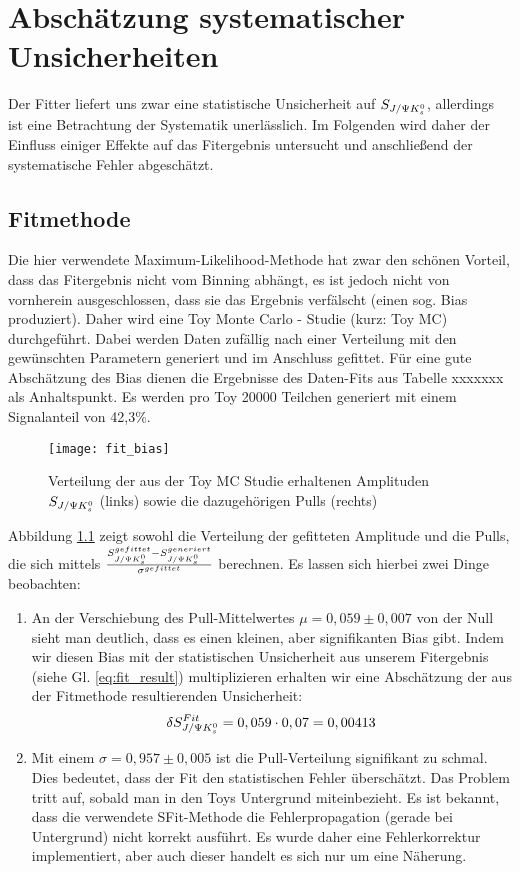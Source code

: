 \chapter{Abschätzung systematischer Unsicherheiten}
Der Fitter liefert uns zwar eine statistische Unsicherheit auf $S_{J/\Psi K_s^0}$, allerdings ist eine Betrachtung der Systematik unerlässlich. Im Folgenden wird daher der Einfluss einiger Effekte auf das Fitergebnis untersucht und anschließend der systematische Fehler abgeschätzt.

\section{Fitmethode} \label{kap:fit_bias}
Die hier verwendete Maximum-Likelihood-Methode hat zwar den schönen Vorteil, dass das Fitergebnis nicht vom Binning abhängt, es ist jedoch nicht von vornherein ausgeschlossen, dass sie das Ergebnis verfälscht (einen sog. Bias produziert). Daher wird eine Toy Monte Carlo - Studie (kurz: Toy MC) durchgeführt. Dabei werden Daten zufällig nach einer Verteilung mit den gewünschten Parametern generiert und im Anschluss gefittet. Für eine gute Abschätzung des Bias dienen die Ergebnisse des Daten-Fits aus Tabelle xxxxxxx als Anhaltspunkt. Es werden pro Toy 20000 Teilchen generiert mit einem Signalanteil von 42,3\%.

\begin{figure}[hptb]
\centering
\texttt{[image: fit\_bias]}
\caption{Verteilung der aus der Toy MC Studie erhaltenen Amplituden $S_{J/\Psi K_s^0}$ (links) sowie die dazugehörigen Pulls (rechts)}
\label{fig:fit_bias}
\end{figure}

Abbildung \ref{fig:fit_bias} zeigt sowohl die Verteilung der gefitteten Amplitude und die Pulls, die sich mittels $\frac{S_{J/\Psi K_s^0}^{gefittet} - S_{J/\Psi K_s^0}^{generiert}}{\sigma^{gefittet}}$ berechnen. Es lassen sich hierbei zwei Dinge beobachten:
\begin{enumerate}
    \item An der Verschiebung des Pull-Mittelwertes $\mu = 0,059 \pm 0,007$ von der Null sieht man deutlich, dass es einen kleinen, aber signifikanten Bias gibt. Indem wir diesen Bias mit der statistischen Unsicherheit aus unserem Fitergebnis (siehe Gl. \ref{eq:fit_result}) multiplizieren erhalten wir eine Abschätzung der aus der Fitmethode resultierenden Unsicherheit:
        \begin{align}
        \delta S_{J/\Psi K_s^0}^{Fit} = 0,059 \cdot 0,07 = 0,00413
        \end{align}

    \item Mit einem $\sigma = 0,957 \pm 0,005$ ist die Pull-Verteilung signifikant zu schmal. Dies bedeutet, dass der Fit den statistischen Fehler überschätzt. Das Problem tritt auf, sobald man in den Toys Untergrund miteinbezieht. Es ist bekannt, dass die verwendete SFit-Methode die Fehlerpropagation (gerade bei Untergrund) nicht korrekt ausführt. Es wurde daher eine Fehlerkorrektur implementiert, aber auch dieser handelt es sich nur um eine Näherung.
\end{enumerate}

